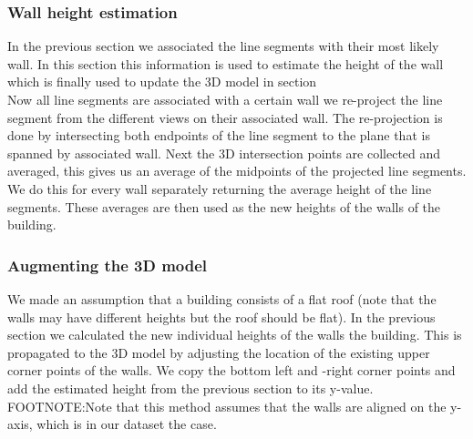 \documentclass[10pt]{article}
\begin{document}

\subsubsection{Wall height estimation}
  	In the previous section we associated the line segments with their most
	likely wall.
	In this section this information is used to estimate the height of the
	wall which is finally used to update the 3D model in section %
	\\
	Now all line segments are associated with a certain wall we re-project the
	line segment from the different views on their associated wall. The re-projection is done by intersecting both endpoints of the line segment to the plane that is spanned by associated wall.
	Next the 3D intersection points are collected and averaged, this gives us an average of the midpoints of the projected line segments. We do this for every wall separately returning the average height of the line segments.
	These averages are then used as the new heights of the walls of the building.

\subsubsection{Augmenting the 3D model} %
	We made an assumption that a building consists of a flat roof (note that the walls may have different heights but the roof should be flat).
	In the previous section we calculated the new individual heights of the walls the building. 
	This is propagated to the 3D model by adjusting the location of the existing upper corner points of the walls. We copy the bottom left and -right corner points and add the estimated height from the previous section to its y-value.
	FOOTNOTE:Note that this method assumes that the walls are aligned on the y-axis, which is in our dataset the case.

	
\end{document}
